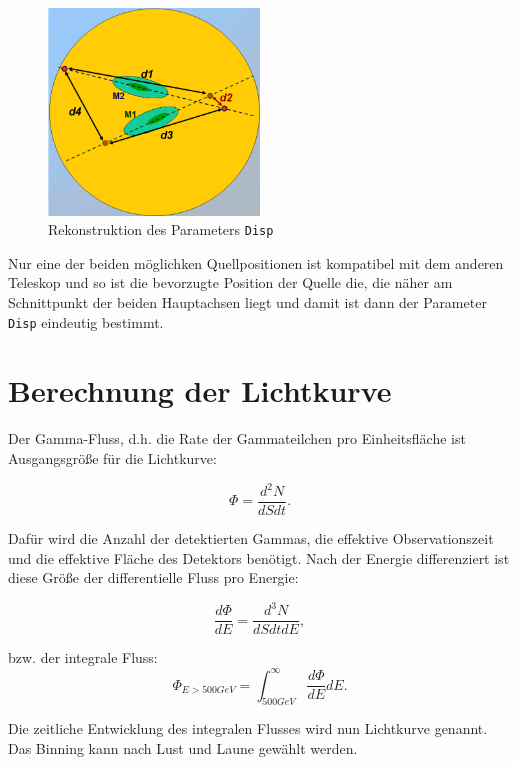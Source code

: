 \begin{figure}
    \centering
    \includegraphics[width=0.5\textwidth]{./Plots/04_MrkAnalyse/Disp.png}
    \caption{Rekonstruktion des Parameters \texttt{Disp}}
    \label{Disp}
\end{figure}

Nur eine der beiden möglichken Quellpositionen ist kompatibel mit dem anderen Teleskop und so ist die bevorzugte Position der Quelle die, die näher am Schnittpunkt der beiden Hauptachsen liegt und damit ist dann der Parameter \texttt{Disp} eindeutig bestimmt.



\section{Berechnung der Lichtkurve}
\label{sec:Lichtkurve}
Der Gamma-Fluss, d.h. die Rate der  Gammateilchen pro Einheitsfläche ist Ausgangsgröße für die Lichtkurve:

\begin{equation}
 \Phi=\frac{d^2 N}{dS dt}. 
\end{equation}

Dafür wird die Anzahl der detektierten Gammas, die effektive Observationszeit und die effektive Fläche des Detektors benötigt.
Nach der Energie differenziert ist diese Größe der differentielle Fluss pro Energie:

\begin{equation}
 \frac{d\Phi}{dE}=\frac{d^3N}{dSdtdE},
\end{equation}

bzw. der integrale Fluss:
\begin{equation}
 \Phi_{E>500GeV}=\int_{500GeV}^{\infty}\frac{d\Phi}{dE}dE.
\end{equation}


Die zeitliche Entwicklung des integralen Flusses wird nun Lichtkurve genannt.
Das Binning kann nach Lust und Laune gewählt werden.

